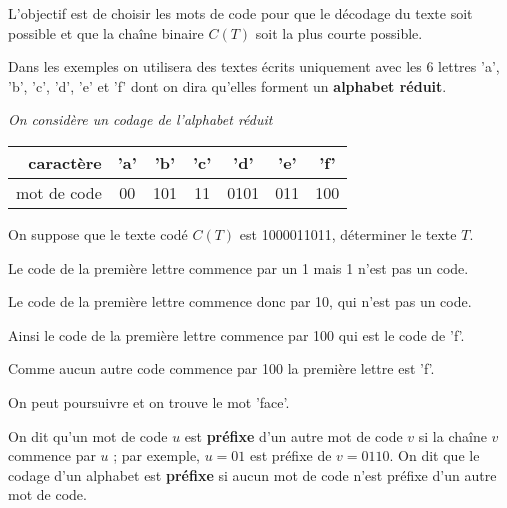 L’objectif est de choisir les mots de code pour que le décodage du texte soit possible et que la chaîne binaire
$C(T)$ soit la plus courte possible.

Dans les exemples on utilisera des textes écrits uniquement avec les 6 lettres 'a', 'b', 'c', 'd', 'e' et 'f' dont on dira qu'elles forment un {\bf alphabet réduit}.
\begin{Exercise}[label=ques:codage]\it
On considère un codage de l'alphabet réduit
\begin{center}
    \begin{tabular}{r|cccccc}
      caractère & 'a'&'b'&'c'&'d'&'e'&'f'\\
      \hline
       mot de code& 00&101&11&0101&011&100\\
    \end{tabular}
  \end{center}
On suppose que le texte codé $C(T)$ est 1000011011, déterminer le texte $T$.
\end{Exercise}
\begin{Answer}

Le code de la première lettre commence par un 1 mais 1 n'est pas un code.

Le code de la première lettre commence donc par 10, qui n'est pas un code.

Ainsi le code de la première lettre commence par 100 qui est le code de 'f'.

Comme aucun autre code commence par 100 la première lettre est 'f'.

\medskip

On peut poursuivre et on trouve le mot 'face'.
\end{Answer}

\medskip

On dit qu’un mot de code $u$ est {\bf préfixe} d’un autre mot de code $v$ si la chaîne $v$ commence par $u$ ; par
exemple, $u = 01$ est préfixe de $v = 0110$.
On dit que le codage d’un alphabet est {\bf préfixe} si aucun mot de code n’est préfixe d’un autre mot de code.

